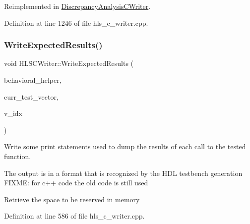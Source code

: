 Reimplemented in \hyperlink{classDiscrepancyAnalysisCWriter_a614b57f4cd76435c0b7266ac677145d5}{Discrepancy\+Analysis\+C\+Writer}.



Definition at line 1246 of file hls\+\_\+c\+\_\+writer.\+cpp.

\mbox{\label{classHLSCWriter_acc0cead1cb01ad8d36eb6a6ead0e034a}} 
\subsubsection{\texorpdfstring{Write\+Expected\+Results()}{WriteExpectedResults()}}
{\footnotesize\ttfamily void H\+L\+S\+C\+Writer\+::\+Write\+Expected\+Results (\begin{DoxyParamCaption}\item[{const \hyperlink{behavioral__helper_8hpp_aae973b54cac87eef3b27442aa3e1e425}{Behavioral\+Helper\+Const\+Ref}}]{behavioral\+\_\+helper,  }\item[{const std\+::map$<$ std\+::string, std\+::string $>$ \&}]{curr\+\_\+test\+\_\+vector,  }\item[{const unsigned}]{v\+\_\+idx }\end{DoxyParamCaption})\hspace{0.3cm}{\ttfamily [protected]}}



Write some print statements used to dump the results of each call to the tested function. 

The output is in a format that is recognized by the H\+DL testbench generation F\+I\+X\+ME\+: for c++ code the old code is still used

Retrieve the space to be reserved in memory 

Definition at line 586 of file hls\+\_\+c\+\_\+writer.\+cpp.



